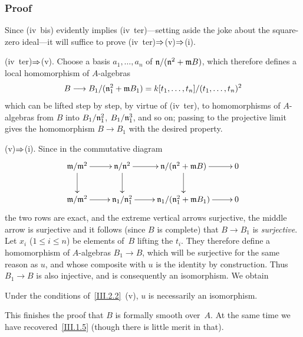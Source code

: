 \subsubsection*{Proof}
Since (iv~bis) evidently implies (iv~ter)—setting aside the joke about
the square-zero ideal—it will suffice to prove (iv~ter)$\To$(v)$\To$(i).

(iv~ter)$\To$(v). Choose a basis $a_1,\dots,a_n$ of
$\mathfrak{n}/(\mathfrak{n}^2+\mathfrak{m}B)$, which therefore defines a
local homomorphism of $A$-algebras
$$
B \to B_1/(\goth{n}_1^2+\goth{m}B_1) = k[t_1, \dots, t_n]/(t_1, \dots,
t_n)^2
$$
which can be lifted step by step, by virtue of (iv~ter), to
homomorphisms of $A$-algebras from $B$ into $B_1/\mathfrak{n}_1^2$,
$B_1/\mathfrak{n}_1^3$, and so on; passing to the projective limit gives
the homomorphism $B \to B_1$ with the desired property.

(v)$\To$(i). Since in the commutative diagram
$$
\xymatrix{ \goth{m}/\goth{m}^2 \ar[r] \ar[d] & \goth{n}/\goth{n}^2
\ar[r] \ar[d] & \goth{n}/(\goth{n}^2+\goth{m}B) \ar[r] \ar[d] & 0 \\
\goth{m}/\goth{m}^2 \ar[r] & \goth{n}_1/\goth{n}_1^2 \ar[r] &
\goth{n}_1/(\goth{n}_1^2+\goth{m}B_1) \ar[r] & 0}
$$
the two rows are exact, and the extreme vertical arrows
surjective, the middle arrow is surjective and it follows (since $B$
is complete) that $B \to B_1$ is \emph{surjective}. Let $x_i$
($1 \leq i \leq n$) be elements of~$B$ lifting the $t_i$. They
therefore define a homomorphism of $A$-algebras $B_1 \to B$, which
will be surjective for the same reason as $u$, and whose composite
with $u$ is the identity by construction. Thus $B_1 \to B$ is also
injective, and is consequently an isomorphism. We obtain

\begin{corollary}
\label{III.2.3}
Under the conditions of~\ref{III.2.2}~\textup{(v)}, $u$ is necessarily
an isomorphism.
\end{corollary}

This finishes the proof that $B$ is formally smooth over~$A$. At the
same time we have recovered~\ref{III.1.5} (though there is little
merit in that).
